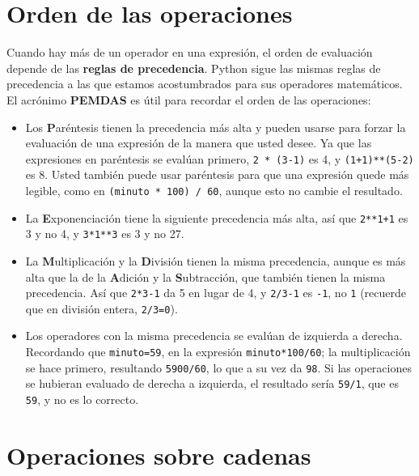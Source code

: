 \section{Orden de las operaciones}

Cuando hay más de un operador en una expresión, el orden de
evaluación depende de las {\bf reglas de precedencia}.  Python sigue
las mismas reglas de precedencia a las que estamos acostumbrados para sus operadores matemáticos.
 El acrónimo {\bf PEMDAS} es útil para recordar el
orden de las operaciones:

\begin{itemize}

\item Los {\bf P}aréntesis tienen la precedencia más alta y pueden
usarse para forzar la evaluación de una expresión de la manera que usted
desee. Ya que las expresiones en paréntesis se evalúan primero, \texttt{2 * (3-1)} es 4, y \texttt{(1+1)**(5-2)} es 8. 
Usted también puede usar paréntesis para
que una expresión quede más legible, como en \texttt{(minuto * 100) / 60}, aunque 
esto no cambie el resultado.

\item La {\bf E}xponenciación tiene la siguiente precedencia más alta, así que
\texttt{2**1+1} es 3 y no 4, y \texttt{3*1**3} es 3 y no 27.

\item La {\bf M}ultiplicación y la {\bf D}ivisión tienen la misma precedencia,
aunque es más alta que la de la  {\bf A}dición y la  {\bf S}ubtracción, que también tienen la misma precedencia.  Así que  \texttt{2*3-1} da 5 en lugar de 4, y
\texttt{2/3-1} es \texttt{-1}, no \texttt{1} (recuerde que en división entera, \texttt{2/3=0}).

\item Los operadores con la misma precedencia se evalúan de izquierda
a derecha.  Recordando que \texttt{minuto=59},  en la expresión \texttt{minuto*100/60}; la multiplicación
se hace primero, resultando \texttt{5900/60}, lo que a su vez da \texttt{98}.
Si las operaciones se hubieran evaluado de derecha a izquierda, el resultado
sería \texttt{59/1}, que es \texttt{59}, y no es lo correcto.

\end{itemize}


\section{Operaciones sobre cadenas}

